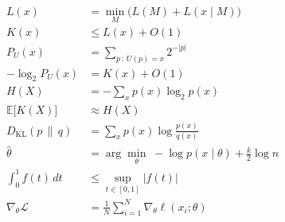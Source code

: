 \begin{align*}
  L(x) &= \min_{M} \bigl( L(M) + L(x \mid M) \bigr) \\
  K(x) &\le L(x) + O(1) \\
  P_U(x) &= \sum_{p \,:\, U(p) = x} 2^{-|p|} \\
  -\log_2 P_U(x) &= K(x) + O(1) \\
  H(X) &= -\sum_{x} p(x) \log_2 p(x) \\
  \mathbb{E}\bigl[K(X)\bigr] &\approx H(X) \\
  D_{\mathrm{KL}}(p \,\|\, q) &= \sum_{x} p(x) \log \frac{p(x)}{q(x)} \\
  \hat\theta &= \arg\min_{\theta} \; -\log p(x \mid \theta) + \tfrac{k}{2} \log n \\
  \int_0^1 f(t)\, dt &\le \sup_{t \in [0,1]} |f(t)| \\
  \nabla_\theta \mathcal{L} &= \frac{1}{N} \sum_{i=1}^{N} \nabla_\theta \ell(x_i; \theta)
\end{align*}
